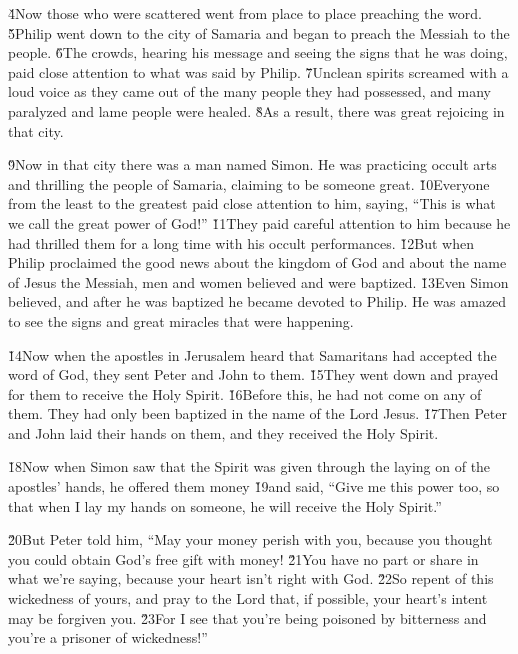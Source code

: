 \v{4}Now those who were scattered went from place to place preaching the word. \v{5}Philip went down to the city of Samaria and began to preach the Messiah to the people. \v{6}The crowds, hearing his message and seeing the signs that he was doing, paid close attention to what was said by Philip. \v{7}Unclean spirits screamed with a loud voice as they came out of the many people they had possessed, and many paralyzed and lame people were healed. \v{8}As a result, there was great rejoicing in that city.

\v{9}Now in that city there was a man named Simon. He was practicing occult arts and thrilling the people of Samaria, claiming to be someone great. \v{10}Everyone from the least to the greatest paid close attention to him, saying, ``This is what we call the great power of God!'' \v{11}They paid careful attention to him because he had thrilled them for a long time with his occult performances. \v{12}But when Philip proclaimed the good news about the kingdom of God and about the name of Jesus the Messiah, men and women believed and were baptized. \v{13}Even Simon believed, and after he was baptized he became devoted to Philip. He was amazed to see the signs and great miracles that were happening.

\v{14}Now when the apostles in Jerusalem heard that Samaritans had accepted the word of God, they sent Peter and John to them. \v{15}They went down and prayed for them to receive the Holy Spirit. \v{16}Before this, he had not come on any of them. They had only been baptized in the name of the Lord Jesus. \v{17}Then Peter and John laid their hands on them, and they received the Holy Spirit.

\v{18}Now when Simon saw that the Spirit was given through the laying on of the apostles' hands, he offered them money \v{19}and said, ``Give me this power too, so that when I lay my hands on someone, he will receive the Holy Spirit.''

\v{20}But Peter told him, ``May your money perish with you, because you thought you could obtain God's free gift with money! \v{21}You have no part or share in what we're saying, because your heart isn't right with God. \v{22}So repent of this wickedness of yours, and pray to the Lord that, if possible, your heart's intent may be forgiven you. \v{23}For I see that you're being poisoned by bitterness and you're a prisoner of wickedness!''

